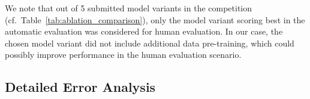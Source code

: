 \documentclass[11pt,a4paper]{article}
\begin{document}
We note that out of 5 submitted model variants in the competition (cf.~Table~\ref{tab:ablation_comparison}), only the model variant scoring best in the automatic evaluation was considered for human evaluation.
In our case, the chosen model variant did not include additional data pre-training, which could possibly improve performance in the human evaluation scenario.



\subsection{Detailed Error Analysis}
\end{document}
